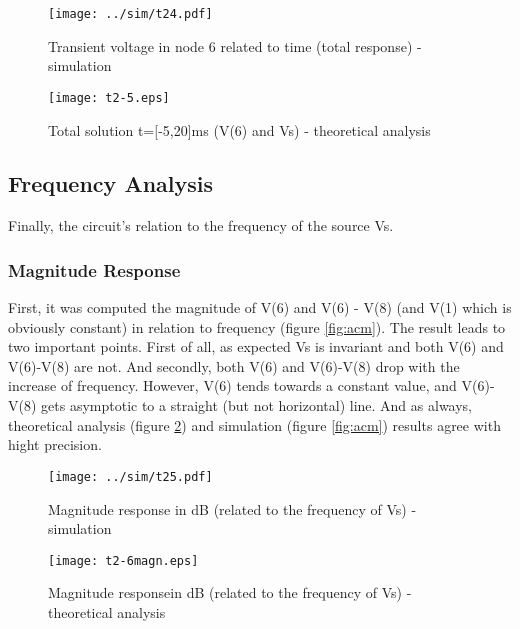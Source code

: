 \begin{figure}[h] \centering
  \begin{minipage}{.5\textwidth}
    \texttt{[image: ../sim/t24.pdf]}
    \caption{Transient voltage in node 6 related to time (total response) - simulation}
    \label{fig:trans2}
    \end{minipage}%
  \begin{minipage}{.5\textwidth}
    \vspace{10mm}
  \centering
    \texttt{[image: t2-5.eps]}
    \caption{Total solution t=[-5,20]ms (V(6) and Vs) - theoretical analysis}
    \label{fig:comptot}
      \end{minipage}%
\end{figure}




\subsection{Frequency Analysis}

Finally, the circuit's relation to the frequency of the source Vs.

\subsubsection{Magnitude Response}

First, it was computed the magnitude of V(6) and V(6) - V(8) (and V(1) which is obviously constant) in relation to frequency (figure \ref{fig:acm}). The result leads to two important points. First of all, as expected Vs is invariant and both V(6) and V(6)-V(8) are not. And secondly, both V(6) and V(6)-V(8) drop with the increase of frequency. However, V(6) tends towards a constant value, and V(6)-V(8) gets asymptotic to a straight (but not horizontal) line. And as always, theoretical analysis (figure \ref{fig:compmagn}) and simulation (figure \ref{fig:acm}) results agree with hight precision.



\begin{figure}[h] \centering
  \begin{minipage}{.5\textwidth}
    \texttt{[image: ../sim/t25.pdf]}
    \caption{Magnitude response in dB (related to the frequency of Vs) - simulation}
    \label{fig:acm}
    \end{minipage}%
  \begin{minipage}{.5\textwidth}
    \vspace{10mm}
  \centering
    \texttt{[image: t2-6magn.eps]}
    \caption{Magnitude responsein dB (related to the frequency of Vs) - theoretical analysis }
    \label{fig:compmagn}
      \end{minipage}%
\end{figure}

